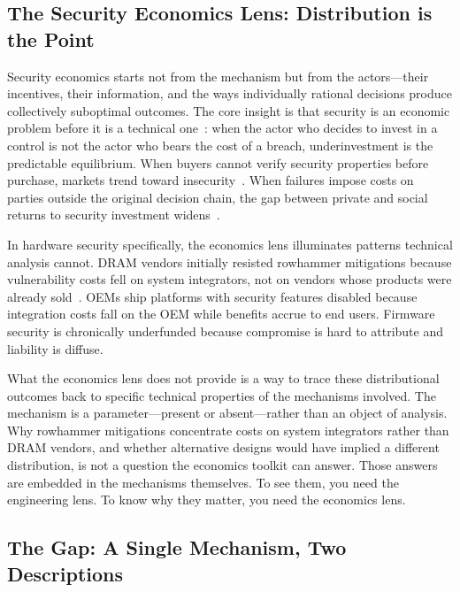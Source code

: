 \subsection{The Security Economics Lens: Distribution is the Point}
\label{sec:economics}

Security economics starts not from the mechanism but from the actors---their
incentives, their information, and the ways individually rational decisions
produce collectively suboptimal outcomes. The core insight is that security
is an economic problem before it is a technical one~\cite{anderson2001why}:
when the actor who decides to invest in a control is not the actor who bears
the cost of a breach, underinvestment is the predictable equilibrium. When
buyers cannot verify security properties before purchase, markets trend toward
insecurity~\cite{akerlof1970lemons}. When failures impose costs on parties
outside the original decision chain, the gap between private and social
returns to security investment widens~\cite{anderson2006economics}.

In hardware security specifically, the economics lens illuminates patterns
technical analysis cannot. DRAM vendors initially resisted rowhammer
mitigations because vulnerability costs fell on system integrators, not on
vendors whose products were already sold~\cite{kim2014flipping,frigo2020trrespass}.
OEMs ship platforms with security features disabled because integration costs
fall on the OEM while benefits accrue to end users. Firmware security is
chronically underfunded because compromise is hard to attribute and liability
is diffuse.

What the economics lens does not provide is a way to trace these distributional
outcomes back to specific technical properties of the mechanisms involved. The
mechanism is a parameter---present or absent---rather than an object of analysis.
Why rowhammer mitigations concentrate costs on system integrators rather than
DRAM vendors, and whether alternative designs would have implied a different
distribution, is not a question the economics toolkit can answer. Those answers
are embedded in the mechanisms themselves. To see them, you need the engineering
lens. To know why they matter, you need the economics lens.

\subsection{The Gap: A Single Mechanism, Two Descriptions}
\label{sec:gap}

